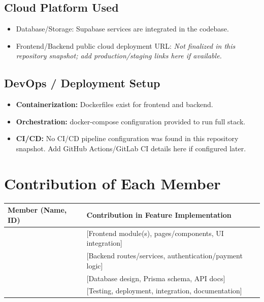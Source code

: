 \documentclass[12pt,a4paper]{report}
\begin{document}
\subsection{Cloud Platform Used}
\begin{itemize}[leftmargin=*]
  \item Database/Storage: Supabase services are integrated in the codebase.
  \item Frontend/Backend public cloud deployment URL: \textit{Not finalized in this repository snapshot; add production/staging links here if available.}
\end{itemize}

\subsection{DevOps / Deployment Setup}
\begin{itemize}[leftmargin=*]
  \item \textbf{Containerization:} Dockerfiles exist for frontend and backend.
  \item \textbf{Orchestration:} docker-compose configuration provided to run full stack.
  \item \textbf{CI/CD:} No CI/CD pipeline configuration was found in this repository snapshot. Add GitHub Actions/GitLab CI details here if configured later.
\end{itemize}

\section{Contribution of Each Member}
\begin{longtable}{|p{}|p{}|}
\hline
\textbf{Member (Name, ID)} & \textbf{Contribution in Feature Implementation} \\
\hline
[Member 1] & [Frontend module(s), pages/components, UI integration] \\
\hline
[Member 2] & [Backend routes/services, authentication/payment logic] \\
\hline
[Member 3] & [Database design, Prisma schema, API docs] \\
\hline
[Member 4] & [Testing, deployment, integration, documentation] \\
\hline
\end{longtable}
\end{document}
